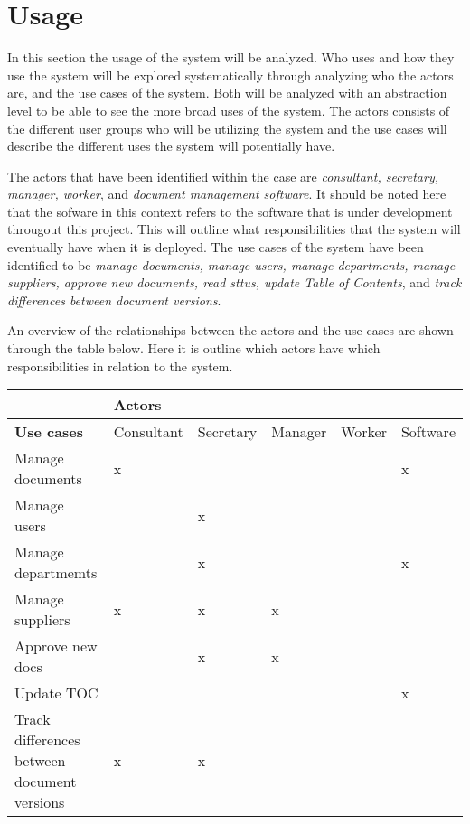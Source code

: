\section{Usage}

In this section the usage of the system will be analyzed. Who uses and how they use the system will be explored systematically through analyzing who the actors are, and the use cases of the system. 
Both will be analyzed with an abstraction level to be able to see the more broad uses of the system.
The actors consists of the different user groups who will be utilizing the system and the use cases will describe the different uses the system will potentially have.

The actors that have been identified within the case are \textit{consultant, secretary, manager, worker}, and \textit{document management software}. 
It should be noted here that the sofware in this context refers to the software that is under development througout this project. 
This will outline what responsibilities that the system will eventually have when it is deployed. 
The use cases of the system have been identified to be \textit{manage documents, manage users, manage departments, manage suppliers, approve new documents, read sttus, update Table of Contents}, and \textit{track differences between document versions}.

An overview of the relationships between the actors and the use cases are shown through the table below. Here it is outline which actors have which responsibilities in relation to the system.

\begin{center}
\begin{tabular}{| m{10em} | m{4.5em} | m{4.5em} | m{4.5em} | m{4.5em} | m{} |}
	\hline
	& \textbf{Actors} & & & & \\
	\hline
	\textbf{Use cases} & Consultant & Secretary & Manager & Worker & Software \\
	\hline
	Manage documents & x & & & & x \\
	\hline
	Manage users & & x & & & \\
	\hline
	Manage departmemts & & x & & & x \\
	\hline
	Manage suppliers & x & x & x & &\\
	\hline
	Approve new docs & & x & x & & \\
	\hline
	Update TOC & & & & & x \\
	\hline
	Track differences between document versions & x & x & & &\\
	\hline
\end{tabular}
\end{center}

